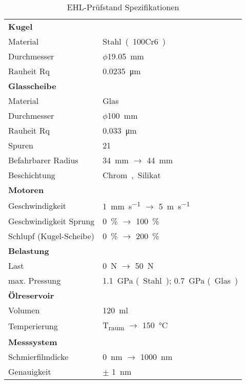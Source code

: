 \begin{table}[htb]
    \centering
    \caption{EHL-Prüfstand Spezifikationen}
    \begin{tabular}{m{5cm}l}
        \multicolumn{2}{l}{\textbf{Kugel}} \\
        Material & \si{Stahl~(100Cr6)} \\
        Durchmesser & $\phi$\SI{19.05}{\milli\meter} \\
        Rauheit Rq & \SI{0.0235}{\micro\meter} \\

        \hline

        \multicolumn{2}{l}{\textbf{Glasscheibe}} \\
        Material & \si{Glas} \\
        Durchmesser & $\phi$\SI{100}{\milli\meter} \\
        Rauheit Rq & \SI{0.033}{\micro\meter} \\
        Spuren & \num{21} \\
        Befahrbarer Radius & \SI{34}{\milli\meter} $\rightarrow$ \SI{44}{\milli\meter} \\
        Beschichtung & \si{Chrom, Silikat} \\

        \hline

        \multicolumn{2}{l}{\textbf{Motoren}} \\
        Geschwindigkeit & \SI{1}{\milli\meter\per\second} $\rightarrow$ \SI{5}{\meter\per\second} \\
        Geschwindigkeit Sprung & \SI{0}{\percent} $\rightarrow$ \SI{100}{\percent} \\
        Schlupf (Kugel-Scheibe) & \SI{0}{\percent} $\rightarrow$ \SI{200}{\percent} \\

        \hline

        \multicolumn{2}{l}{\textbf{Belastung}} \\
        Last & \SI{0}{\newton} $\rightarrow$ \SI{50}{\newton} \\
        max. Pressung & \SI{1.1}{\giga\pascal} \si{(Stahl)}; \SI{0.7}{\giga\pascal} \si{(Glas)} \\

        \hline

        \multicolumn{2}{l}{\textbf{Ölreservoir}} \\
        Volumen & \SI{120}{\milli\litre} \\
        Temperierung & \si{T_{raum}} $\rightarrow$ \SI{150}{\degreeCelsius} \\

        \hline

        \multicolumn{2}{l}{\textbf{Messsystem}} \\
        Schmierfilmdicke & \SI{0}{\nano\meter} $\rightarrow$ \SI{1000}{\nano\meter} \\
        Genauigkeit & $\pm$ \SI{1}{\nano\meter} \\
    \end{tabular}
    \label{tab:ehl_specs}
\end{table}

